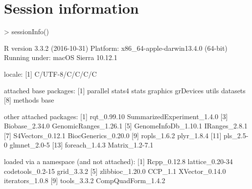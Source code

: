 \documentclass{article}
\begin{document}
\section{Session information}
\begin{Schunk}
\begin{Sinput}
> sessionInfo()
\end{Sinput}
\begin{Soutput}
R version 3.3.2 (2016-10-31)
Platform: x86_64-apple-darwin13.4.0 (64-bit)
Running under: macOS Sierra 10.12.1

locale:
[1] C/UTF-8/C/C/C/C

attached base packages:
[1] parallel  stats4    stats     graphics  grDevices utils     datasets 
[8] methods   base     

other attached packages:
 [1] rqt_0.99.10                SummarizedExperiment_1.4.0
 [3] Biobase_2.34.0             GenomicRanges_1.26.1      
 [5] GenomeInfoDb_1.10.1        IRanges_2.8.1             
 [7] S4Vectors_0.12.1           BiocGenerics_0.20.0       
 [9] ropls_1.6.2                plyr_1.8.4                
[11] pls_2.5-0                  glmnet_2.0-5              
[13] foreach_1.4.3              Matrix_1.2-7.1            

loaded via a namespace (and not attached):
 [1] Rcpp_0.12.8        lattice_0.20-34    codetools_0.2-15   grid_3.3.2        
 [5] zlibbioc_1.20.0    CCP_1.1            XVector_0.14.0     iterators_1.0.8   
 [9] tools_3.3.2        CompQuadForm_1.4.2
\end{Soutput}
\end{Schunk}
\end{document}
